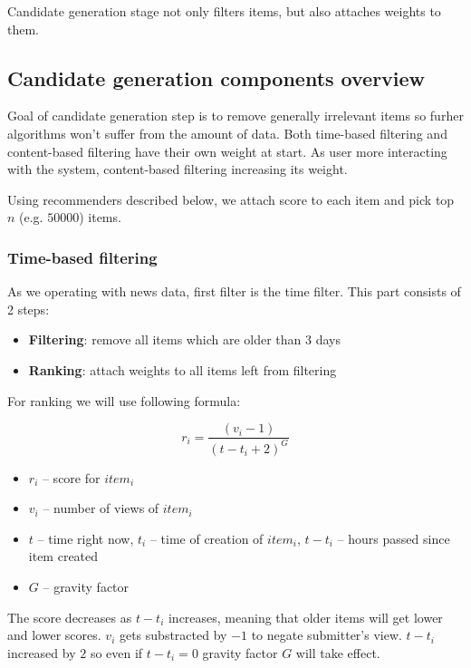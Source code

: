 \documentclass{article}
\begin{document}
Candidate generation stage not only filters items, but also attaches weights to them.

\subsection{Candidate generation components overview}

Goal of candidate generation step is to remove generally irrelevant items so furher algorithms won't suffer from the amount of data. Both time-based filtering and content-based filtering have their own weight at start. As user more interacting with the system, content-based filtering increasing its weight.

Using recommenders described below, we attach score to each item and pick top $n$ (e.g. $50 000$) items.

\subsubsection{Time-based filtering}

As we operating with news data, first filter is the time filter. This part consists of 2 steps:

\begin{itemize}
    \item \textbf{Filtering}: remove all items which are older than 3 days
    \item \textbf{Ranking}: attach weights to all items left from filtering
\end{itemize}

For ranking we will use following formula:

$$r_i = \frac{(v_i - 1)}{(t - t_i + 2)^G}$$


\begin{itemize}
    \item $r_i$ -- score for $item_i$
    \item $v_i$ -- number of views of $item_i$
    \item $t$ -- time right now, $t_i$ -- time of creation of $item_i$, $t - t_i$ -- hours passed since item created
    \item $G$ -- gravity factor
\end{itemize}

The score decreases as $t - t_i$ increases, meaning that older items will get lower and lower scores. $v_i$ gets substracted by $-1$ to negate submitter's view. $t - t_i$ increased by $2$ so even if $t - t_i = 0$ gravity factor $G$ will take effect.
\end{document}
